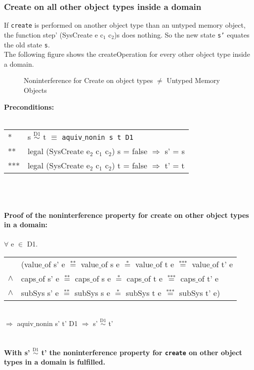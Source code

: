 \subsubsection{Create on all other object types inside a domain}
If \texttt{create} is performed on another object type than an untyped memory object, the  function step' (SysCreate e c$_1$ c$_2$)s does nothing. So the new state \texttt{s'} equates the old state \texttt{s}. \\
The following figure shows the createOperation for every other object type inside a domain.\\
\begin{flushleft}
\begin{figure}[H]
\caption{Noninterference for Create on object types $\neq$ Untyped Memory Objects}
\end{figure}
\end{flushleft} 
\textbf{Preconditions:} \\ \\
\begin{tabular}{ll}
* & s $\overset{\text{D1}}{\sim}$ t $\equiv$ \texttt{aquiv$\_$nonin s t D1}	\\ 
** & legal (SysCreate e$_2$ c$_1$ c$_2$) s = false $\Rightarrow$ s' = s \\ 
*** & legal (SysCreate e$_2$ c$_1$ c$_2$) t = false $\Rightarrow$ t' = t
\end{tabular}\\ \\  \\
\textbf{Proof of the noninterference property for create on other object types in a domain:} \\ \\
$\forall$ e $\in$ D1. \\ 
\begin{tabular}{ll}
& (value$\_$of s' e $\overset{\text{**}}{=}$ value$\_$of s e $\overset{\text{*}}{=}$ value$\_$of t e $\overset{\text{***}}{=}$ value$\_$of t' e \\
$\wedge$ & caps$\_$of s' e $\overset{\text{**}}{=}$ caps$\_$of s e $\overset{\text{*}}{=}$ caps$\_$of t e $\overset{\text{***}}{=}$ caps$\_$of t' e \\
$\wedge$ & subSys s' e $\overset{\text{**}}{=}$ subSys s e $\overset{\text{*}}{=}$ subSys t e $\overset{\text{***}}{=}$ subSys t' e)
\end{tabular} \\
$\Rightarrow$ aquiv$\_$nonin s' t' D1 $\Rightarrow$ s' $\overset{\text{D1}}{\sim}$ t' \\ \\ \\
\textbf{With s' $\overset{\text{D1}}{\sim}$ t' the noninterference property for \texttt{create} on other object types in a domain is fulfilled.} 
\clearpage
